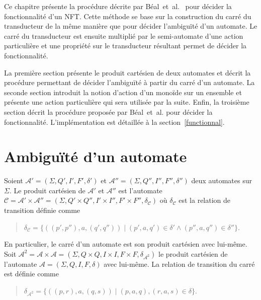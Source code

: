 \label{fonctionnel}

Ce chapitre présente la procédure décrite par Béal~et~al.~\cite{Bea03} pour décider la fonctionnalité d'un NFT. Cette méthode se base sur la construction du carré du transducteur de la même manière que pour décider l'ambiguïté d'un automate. Le carré du transducteur est ensuite multiplié par le semi-automate d'une action particulière et une propriété sur le transducteur résultant permet de décider la fonctionnalité. 

La première section présente le produit cartésien de deux automates et décrit la procédure permettant de décider l'ambiguïté à partir du carré d'un automate. La seconde section introduit la notion d'action d'un monoïde sur un ensemble et présente une action particulière qui sera utilisée par la suite. Enfin, la troisième section décrit la procédure proposée par Béal~et~al. pour décider la fonctionnalité. L'implémentation est détaillée à la section~\ref{functionnal}.

\section{Ambiguïté d'un automate}
	
	Soient $\mathscr{A}' = (\Sigma, Q', I', F', \delta')$ et $\mathscr{A}'' = (\Sigma, Q'', I'', F'', \delta'')$ deux automates sur $\Sigma$. Le produit cartésien de $\mathscr{A}'$ et $\mathscr{A}''$ est l'automate $\mathscr{C} = \mathscr{A}' \times \mathscr{A}'' = (\Sigma, Q'\times Q'', I' \times I'', F' \times F'', \delta_\mathscr{C})$ où $\delta_\mathscr{C}$ est la relation de transition définie comme
	
	\begin{quotation}
		$\delta_\mathscr{C} = \{((p',p''), a, (q',q'')) \mid (p', a, q') \in \delta' \wedge (p'', a, q'') \in \delta''\}$.
	\end{quotation}
	
	En particulier, le carré d'un automate est son produit cartésien avec lui-même. Soit $\mathscr{A}^2 = \mathscr{A} \times \mathscr{A} = (\Sigma, Q \times Q, I \times I, F \times F, \delta_{\mathscr{A}^2})$ le produit cartésien de l'automate $\mathscr{A} = (\Sigma, Q, I, F, \delta)$ avec lui-même. La relation de transition du carré est définie comme
	
	\begin{quotation}
		$\delta_{\mathscr{A}^2} = \{((p,r), a, (q,s)) \mid (p, a, q), (r, a, s) \in \delta\}$.
	\end{quotation}
	

